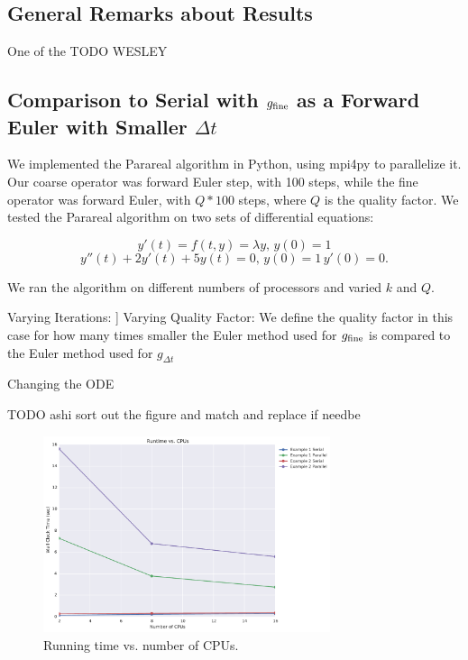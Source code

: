 \documentclass[letterpaper,12pt]{article}
\begin{document}
\subsection{General Remarks about Results}
One of the TODO WESLEY

\subsection{Comparison to Serial with $g_{\textnormal{fine}}$ as a Forward Euler with
Smaller $\Delta t$}

We implemented the Parareal algorithm in Python, using mpi4py to parallelize it.
Our coarse operator was forward Euler step, with 100 steps, while the fine
operator was forward Euler, with $Q * 100$ steps, where $Q$ is the quality
factor. We tested the Parareal algorithm on two sets of differential equations:

\[
y'(t) = f(t, y) = \lambda y, \, y(0) = 1
\]
\[
y''(t) + 2y'(t) + 5y(t) = 0, \, y(0) = 1 \, y'(0) = 0.
\]

We ran the algorithm on different numbers of processors and varied $k$ and $Q$. 

Varying Iterations:
]
Varying Quality Factor:
We define the quality factor in this case for how many times smaller the Euler method used for $g_{\textnormal{fine}}$ is compared to the Euler method used for $g_{\Delta t}$

Changing the ODE

TODO ashi sort out the figure and match and replace if needbe

\begin{figure}
\includegraphics[width=0.75\textwidth]{data/runtime_vs_cpus.pdf}
\caption{Running time vs. number of CPUs.}
\label{fig:run_v_cpu}
\end{figure}
\end{document}
